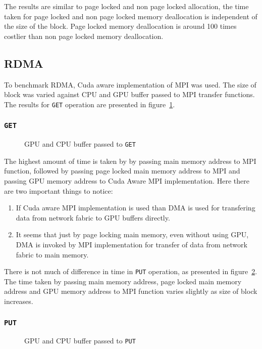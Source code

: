The results are similar to page locked and non page locked allocation, the time
taken for page locked and non page locked memory deallocation is independent of
the size of the block. Page locked memory deallocation is around 100 times costlier
than non page locked memory deallocation.

\subsection{RDMA}
To benchmark RDMA, Cuda aware implementation of MPI was used. The size of block
was varied against CPU and GPU buffer passed to MPI transfer functions. The results
for \texttt{GET} operation are presented in figure~\ref{fig:mempin_rdma_get}.

\subsubsection{\texttt{GET}}
\begin{figure}[h]
  
  \caption{GPU and CPU buffer passed to \texttt{GET}}
  \label{fig:mempin_rdma_get}
\end{figure}


The highest amount of time is taken by by passing main memory address to MPI function,
followed by passing page locked main memory address to MPI and passing GPU memory
address to Cuda Aware MPI implementation. Here there are two important things to
notice:
\begin{enumerate}
\item If Cuda aware MPI implementation is used than DMA is used for transfering
  data from network fabric to GPU buffers directly.
\item It seems that just by page locking main memory, even without using GPU, DMA
  is invoked by MPI implementation for transfer of data from network fabric to
  main memory.
\end{enumerate}

There is not much of difference in time in \texttt{PUT} operation, as presented
in figure~\ref{fig:mempin_rdma_put}. The time taken by passing main memory address,
page locked main memory address and GPU memory address to MPI function varies slightly
as size of block increases.

\subsubsection{\texttt{PUT}}
\begin{figure}[h]
  
  \caption{GPU and CPU buffer passed to \texttt{PUT}}
  \label{fig:mempin_rdma_put}
\end{figure}

